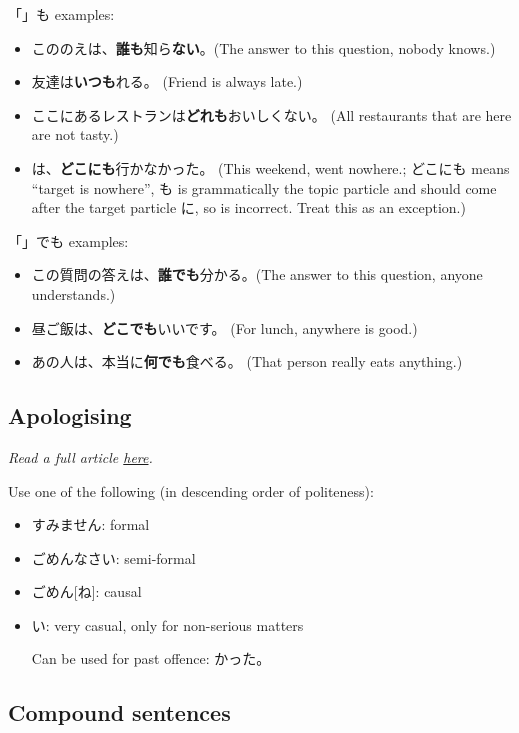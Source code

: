 \documentclass[../nihongo-gakushuu-kyouzai.tex]{subfiles}
\begin{document}
「」も examples:
\begin{itemize}
    \item こののえは、\textbf{誰も}知ら\textbf{ない}。(The answer to this question, nobody knows.)
    \item 友達は\textbf{いつも}れる。 (Friend is always late.)
    \item ここにあるレストランは\textbf{どれも}おいしくない。 (All restaurants that are here are not tasty.)
    \item {}は、\textbf{どこにも}行かなかった。 (This weekend, went nowhere.; どこにも means ``target is nowhere'', も is grammatically the topic particle and should come after the target particle に, so  is incorrect. Treat this as an exception.)
\end{itemize}

「」でも examples:
\begin{itemize}
    \item この質問の答えは、\textbf{誰でも}分かる。(The answer to this question, anyone understands.)
    \item 昼ご飯は、\textbf{どこでも}いいです。 (For lunch, anywhere is good.)
    \item あの人は、本当に\textbf{何でも}食べる。 (That person really eats anything.)
\end{itemize}

\subsection{Apologising}
\emph{Read a full article \href{https://www.clozemaster.com/blog/sorry-in-japanese/}{here}.}

Use one of the following (in descending order of politeness):
\begin{itemize}
    \item すみません: formal
    \item ごめんなさい: semi-formal
    \item ごめん[ね]: causal
    \item {}い: very casual, only for non-serious matters

    Can be used for past offence: かった。
\end{itemize}

\subsection{Compound sentences}
\end{document}
